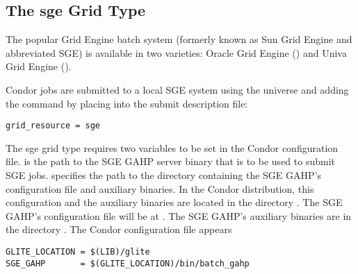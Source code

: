 
\subsection{\label{sec:SGE}The sge Grid Type }

The popular Grid Engine batch system (formerly known as Sun Grid Engine and
abbreviated SGE) is available in two varieties:
Oracle Grid Engine
()
and Univa Grid Engine
().

Condor jobs are submitted to a local SGE system
using the  universe and adding the
 command by placing
into the submit description file:
\begin{verbatim}
grid_resource = sge
\end{verbatim}

The sge grid type requires two variables to be set in the Condor
configuration file.
 is the path to the SGE GAHP server binary that is to be
used to submit SGE jobs.
 specifies the path to the directory containing the 
SGE GAHP's configuration file and auxiliary binaries.
In the Condor distribution, this configuration and the auxiliary binaries
are located in the directory .
The SGE GAHP's configuration file will be at
.
The SGE GAHP's auxiliary binaries
are in the directory .
The Condor configuration file appears

\footnotesize
\begin{verbatim}
GLITE_LOCATION = $(LIB)/glite
SGE_GAHP       = $(GLITE_LOCATION)/bin/batch_gahp
\end{verbatim}
\normalsize

